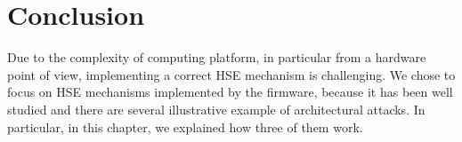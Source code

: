 \section{Conclusion}
\label{sec:usecase:conclusion}

Due to the complexity of computing platform, in particular from a hardware point
of view, implementing a correct HSE mechanism is challenging.
%
We chose to focus on HSE mechanisms implemented by the firmware, because it has
been well studied and there are several illustrative example of architectural
attacks.
%
In particular, in this chapter, we explained how three of them work.
